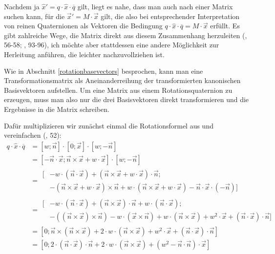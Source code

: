 Nachdem ja $\hat{x}'= q \cdot \hat{x} \cdot \overline{q}$ gilt, liegt es nahe, dass man auch nach einer Matrix suchen kann, für die $\vec{x}' = M \cdot \vec{x}$ gilt, die also bei entsprechender Interpretation von reinen Quaternionen als Vektoren die Bedingung $q \cdot \hat{x} \cdot \overline{q} = M \cdot \vec{x}$ erfüllt. Es gibt zahlreiche Wege, die Matrix direkt aus diesem Zusammenhang herzuleiten (\vgl \citep{quaternionrotation}, 56-58; \citep{script:spain}, 93-96), ich möchte aber stattdessen eine andere Möglichkeit zur Herleitung anführen, die leichter nachzuvollziehen ist.

Wie in Abschnitt \ref{rotationbasevectors} besprochen, kann man eine Transformationsmatrix als Aneinanderreihung der transformierten kanonischen Basisvektoren aufstellen. Um eine Matrix aus einem Rotationsquaternion zu erzeugen, muss man also nur die drei Basisvektoren direkt transformieren und die Ergebnisse in die Matrix schreiben.

Dafür multiplizieren wir zunächst einmal die Rotationsformel aus und vereinfachen (\vgl \citep{quaternionrotation}, 52):
\begin{equation}
\begin{split}
 q \cdot \hat{x} \cdot \overline{q} &= \left[ w; \vec n \right] \cdot \left[ 0; \vec x \right] \cdot \left[ w; -\vec n \right] \\
 &= \left[ - \vec n \cdot \vec x; \vec n \times \vec x + w \cdot \vec x \right] \cdot \left[ w; -\vec n \right] \\
 &= \begin{split}[ &- w \cdot ( \vec n \cdot \vec x ) + ( \vec n \times \vec x + w \cdot \vec x ) \cdot \vec n; \\
  &- ( \vec n \times \vec x + w \cdot \vec x ) \times \vec n + w \cdot ( \vec n \times \vec x + w \cdot \vec x ) - \vec n \cdot \vec x \cdot ( - \vec n ) ] \end{split} \\
 &= \begin{split}[ &- w \cdot ( \vec n \cdot \vec x ) + ( \vec n \times \vec x ) \cdot \vec n + w \cdot ( \vec n \cdot \vec x ); \\
  &- ( ( \vec n \times \vec x ) \times \vec n ) - w \cdot ( \vec x \times \vec n ) + w \cdot ( \vec n \times \vec x ) + w^2 \cdot \vec x + ( \vec n \cdot \vec x ) \cdot \vec n ] \end{split} \\
 &= \left[ 0; \vec n \times ( \vec n \times \vec x ) + 2 \cdot w \cdot ( \vec n \times \vec x ) + w^2 \cdot \vec x + ( \vec n \cdot \vec x ) \cdot \vec n \right] \\
 &= \left[ 0; 2 \cdot ( \vec n \cdot \vec x ) \cdot \vec n + 2 \cdot w \cdot ( \vec n \times \vec x ) + ( w^2 - \vec n \cdot \vec n ) \cdot \vec x \right]
\end{split}
\end{equation}


